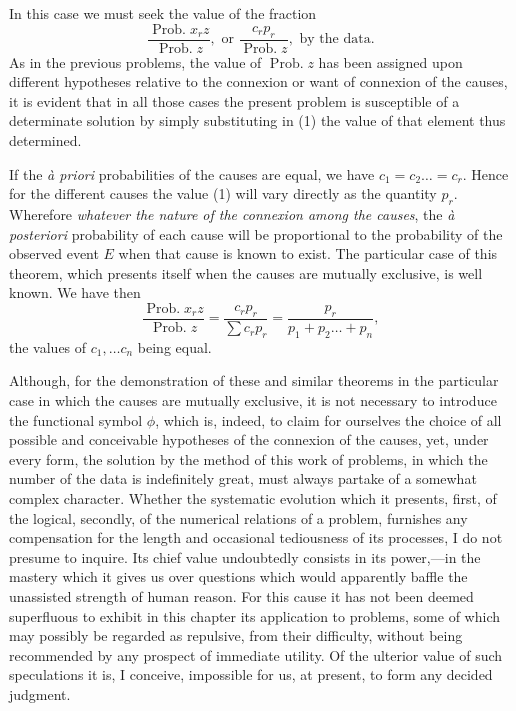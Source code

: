 \documentclass[oneside]{book}
\begin{document}
In this case we must seek the value of the fraction
\begin{equation}\tag{1}
\frac{\operatorname{Prob. } x_r z}{\operatorname{Prob. } z}, \text{ or }
\frac{c_r p_r}{\operatorname{Prob. } z}, \text{ by the data.}
\end{equation}
As in the previous problems, the value of $\operatorname{Prob. } z$ has been
assigned upon different hypotheses relative to the connexion or
want of connexion of the causes, it is evident that in all those
cases the present problem is susceptible of a determinate solution
by simply substituting in (1) the value of that element thus
determined.

If the \textit{\`{a} priori} probabilities of the causes are equal, we have
$c_1 = c_2 \dotso = c_r$. Hence for the different causes the value (1) will
vary directly as the quantity $p_r$. Wherefore \emph{whatever the nature
of the connexion among the causes}, the \textit{\`{a} posteriori} probability of
each cause will be proportional to the probability of the observed
event $E$ when that cause is known to exist. The particular case
of this theorem, which presents itself when the causes are
mutually exclusive, is well known. We have then
\begin{equation*}
\frac{\operatorname{Prob. } x_r z}{\operatorname{Prob. } z}=
\frac{c_r p_r}{{\textstyle \sum} c_r p_r}=\frac{p_r}{p_1 + p_2\dotsc + p_n},
\end{equation*}
the values of $c_1, \dotsc c_n$ being equal.

Although, for the demonstration of these and similar
theorems in the particular case in which the causes are mutually
exclusive, it is not necessary to introduce the functional symbol $\phi$,
which is, indeed, to claim for ourselves the choice of all possible
and conceivable hypotheses of the connexion of the causes, yet,
under every form, the solution by the method of this work of
problems, in which the number of the data is indefinitely great,
must always partake of a somewhat complex character. Whether
the systematic evolution which it presents, first, of the logical,
secondly, of the numerical relations of a problem, furnishes
any compensation for the length and occasional tediousness of its
processes, I do not presume to inquire. Its chief value undoubtedly
consists in its power,---in the mastery which it gives us over
questions which would apparently baffle the unassisted strength
of human reason. For this cause it has not been deemed superfluous
to exhibit in this chapter its application to problems, some
of which may possibly be regarded as repulsive, from their
difficulty, without being recommended by any prospect of immediate
utility. Of the ulterior value of such speculations it is, I
conceive, impossible for us, at present, to form any decided judgment.
\end{document}
